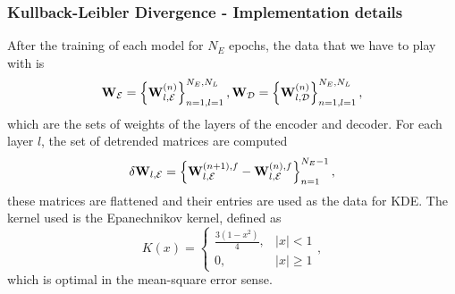 \documentclass[11pt,aspectratio=169]{beamer}
\newcommand{\abs}[1]{\left|#1\right|}
\newcommand{\parens}[1]{\left(#1\right)}
\newcommand{\bracks}[1]{\left\{#1\right\}}
\begin{document}

    \begin{frame}
        \frametitle{Kullback-Leibler Divergence - Implementation details}
        After the training of each model for $N_E$ epochs, the 
        data that we have to play with is 
        \begin{equation}
            {\bf W}_\mathcal{E} = \bracks{{\bf W}_{l,\mathcal{E}}^{(n)}}_{n=1, l=1}^{N_E, N_L}, 
            {\bf W}_\mathcal{D} = \bracks{{\bf W}_{l,\mathcal{D}}^{(n)}}_{n=1, l=1}^{N_E, N_L}, 
        \end{equation}
        which are the sets of weights of the layers of the encoder and decoder. 
        For each layer $l$, the set of detrended matrices are computed
        \begin{equation}
            \delta{\bf W}_{l, \mathcal{E}} = \bracks{{\bf W}_{l,\mathcal{E}}^{(n+1),f} - {\bf W}_{l,\mathcal{E}}^{(n),f}}_{n=1}^{N_E-1},
        \end{equation}
        these matrices are flattened and their entries are used as the data for KDE.
        The kernel used is the Epanechnikov kernel, defined as 
        \begin{equation}
            K(x) = 
            \begin{cases}
                \frac{3(1-x^2)}{4}, & \abs{x} < 1 \\
                0, & \abs{x} \geq 1
            \end{cases},\label{eqn:epanechnikov}
        \end{equation}
        which is optimal in the mean-square error sense. 
    \end{frame}
\end{document}
